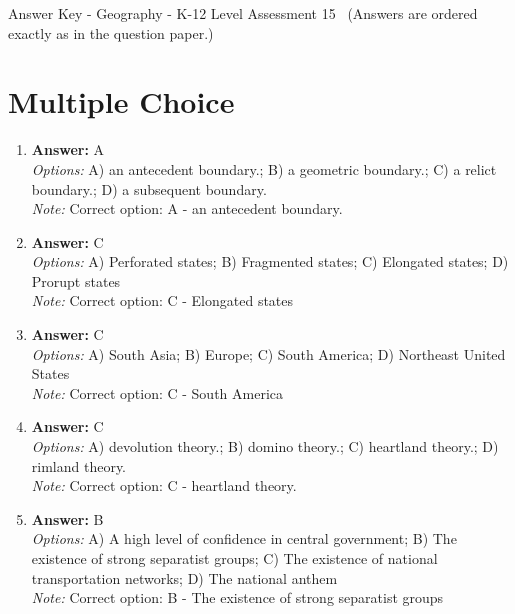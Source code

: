 \documentclass[12pt]{article}
\begin{document}
\begin{center}
Answer Key - Geography - K-12 Level Assessment 15 \
\small (Answers are ordered exactly as in the question paper.)
\end{center}

\section*{Multiple Choice}
\begin{enumerate}[label=\arabic*.]
\item \textbf{Answer:} A
\\ \textit{Options:} A) an antecedent boundary.; B) a geometric boundary.; C) a relict boundary.; D) a subsequent boundary.
\\ \textit{Note:} Correct option: A - an antecedent boundary.
\item \textbf{Answer:} C
\\ \textit{Options:} A) Perforated states; B) Fragmented states; C) Elongated states; D) Prorupt states
\\ \textit{Note:} Correct option: C - Elongated states
\item \textbf{Answer:} C
\\ \textit{Options:} A) South Asia; B) Europe; C) South America; D) Northeast United States
\\ \textit{Note:} Correct option: C - South America
\item \textbf{Answer:} C
\\ \textit{Options:} A) devolution theory.; B) domino theory.; C) heartland theory.; D) rimland theory.
\\ \textit{Note:} Correct option: C - heartland theory.
\item \textbf{Answer:} B
\\ \textit{Options:} A) A high level of confidence in central government; B) The existence of strong separatist groups; C) The existence of national transportation networks; D) The national anthem
\\ \textit{Note:} Correct option: B - The existence of strong separatist groups
\end{enumerate}
\end{document}
